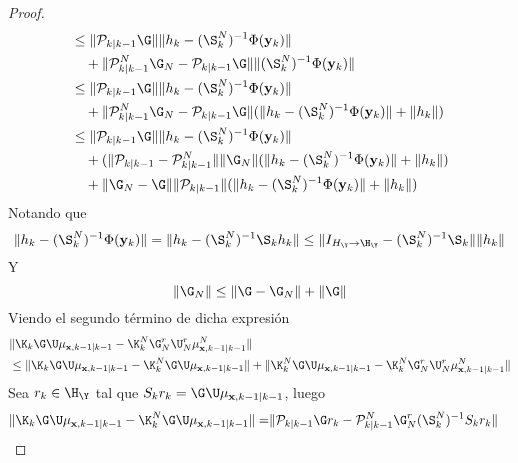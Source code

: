 \begin{proof}
\begin{equation*}
\begin{aligned}
			& \leq \| \mathcal{P}_{k|k-1} \G \| \| h_k - (\S_k^N)^{-1} \Phi(\mathbf{y}_k)  \| \\
			& \quad + \|  \mathcal{P}_{k|k-1}^N \G_N -  \mathcal{P}_{k|k-1} \G \| \| (\S_k^N)^{-1} \Phi(\mathbf{y}_k)\| \\
			& \leq \| \mathcal{P}_{k|k-1} \G \| \| h_k - (\S_k^N)^{-1} \Phi(\mathbf{y}_k)  \| \\
			& \quad + \|  \mathcal{P}_{k|k-1}^N \G_N -  \mathcal{P}_{k|k-1} \G \| ( \| h_k - (\S_k^N)^{-1} \Phi(\mathbf{y}_k)\|  + \| h_k \|) \\
			& \leq \| \mathcal{P}_{k|k-1} \G \| \| h_k - (\S_k^N)^{-1} \Phi(\mathbf{y}_k)  \| \\
			& \quad +  (\| \mathcal{P}_{k|k-1} - \mathcal{P}_{k|k-1}^N \| \| \G_N \| ( \| h_k - (\S_k^N)^{-1} \Phi(\mathbf{y}_k)\|  + \| h_k \|) \\
			& \quad + \| \G_N - \G \| \| \mathcal{P}_{k|k-1} \| ( \| h_k - (\S_k^N)^{-1} \Phi(\mathbf{y}_k)\|  + \| h_k \|) \\
		\end{aligned}
	\end{equation*}
	Notando que
	\begin{equation*}
		\| h_k - (\S_k^N)^{-1} \Phi(\mathbf{y}_k) \|  = \| h_k - (\S_k^N)^{-1} \S_k h_k \| \leq \| I_{H_\Y \to \H_\Y} - (\S_k^N)^{-1} \S_k \| \| h_k \|
	\end{equation*}
	Y 
	\begin{equation*}
		\| \G_N \| \leq \| \G - \G_N \| + \| \G \|
	\end{equation*}
	Viendo el segundo término de dicha expresión
	\begin{equation*}
		\begin{aligned}
			& \| \K_k  \G  \U  \mu_{\mathbf{x},k-1|k-1} - \K_k^N \G_N^r \U_N^r \mu_{\mathbf{x}, k-1 | k-1}^N  \| \\
			& \leq \| \K_k  \G  \U  \mu_{\mathbf{x},k-1|k-1} - \K_k^N \G \U \mu_{\mathbf{x}, k-1 | k-1}  \|  +  \| \K_k^N \G \U \mu_{\mathbf{x}, k-1 | k-1} - \K_k^N \G_N^r \U_N^r \mu_{\mathbf{x}, k-1 | k-1}^N \| 
		\end{aligned}
	\end{equation*}
	Sea $r_k \in \H_\Y$ tal que $S_k r_k = \G  \U  \mu_{\mathbf{x},k-1|k-1}$, luego 
	\begin{equation*}
		\begin{aligned}
			\| \K_k  \G  \U  \mu_{\mathbf{x},k-1|k-1} - \K_k^N \G \U \mu_{\mathbf{x}, k-1 | k-1}  \| = 
			& \| \mathcal{P}_{k|k-1} \G
			r_k -  \mathcal{P}_{k|k-1}^N \G_N^r (\S_k^N)^{-1} S_k r_k \| 

\end{aligned}
\end{equation*}
\end{proof}
